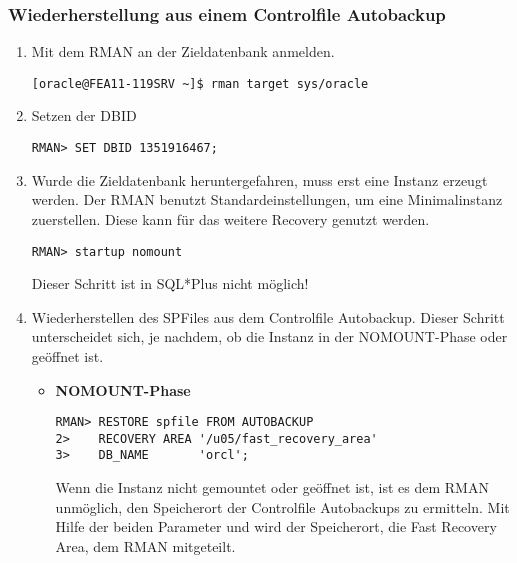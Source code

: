         \subsubsection{Wiederherstellung aus einem Controlfile Autobackup}
          \begin{enumerate}
            \item Mit dem RMAN an der Zieldatenbank anmelden.
              \begin{lstlisting}[caption={An der Zieldatenbank anmelden},label=admin1418,language=rman]
[oracle@FEA11-119SRV ~]$ rman target sys/oracle
              \end{lstlisting}
            \item Setzen der DBID
              \begin{lstlisting}[caption={Setzen der DBID},label=admin1419,language=rman]
RMAN> SET DBID 1351916467;
              \end{lstlisting}
            \item Wurde die Zieldatenbank heruntergefahren, muss erst eine Instanz erzeugt werden. Der RMAN benutzt Standardeinstellungen, um eine Minimalinstanz zuerstellen. Diese kann f\"ur das weitere Recovery genutzt werden.
              \begin{lstlisting}[caption={Zieldatenbank im RMAN in den NOMOUNT-Status bringen},label=admin1420,language=rman,alsolanguage=sqlplus]
RMAN> startup nomount
              \end{lstlisting}
              \begin{merke}
                Dieser Schritt ist in SQL*Plus nicht m\"oglich!
              \end{merke}
            \item Wiederherstellen des SPFiles aus dem Controlfile Autobackup. Dieser Schritt unterscheidet sich, je nachdem, ob die Instanz in der NOMOUNT-Phase oder ge\"offnet ist.
              \begin{itemize}
                \item \textbf{NOMOUNT-Phase}
                  \begin{lstlisting}[caption={Wiederherstellen des SPFiles aus dem Controlfile Autobackup},label=admin1421,language=rman]
RMAN> RESTORE spfile FROM AUTOBACKUP
2>    RECOVERY AREA '/u05/fast_recovery_area'
3>    DB_NAME       'orcl';
                  \end{lstlisting}
                  \begin{merke}
                    Wenn die Instanz nicht gemountet oder ge\"offnet ist, ist es dem RMAN unm\"oglich, den Speicherort der Controlfile Autobackups zu ermitteln. Mit Hilfe der beiden Parameter  und  wird der Speicherort, die Fast Recovery Area, dem RMAN mitgeteilt.

\end{merke}
\end{itemize}
\end{enumerate}
